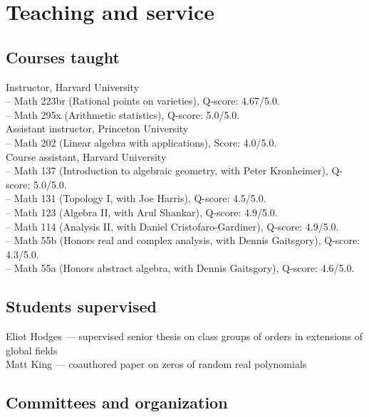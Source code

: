 \documentclass[11pt]{article} %
\begin{document}
\vspace*{-5PT}

\section*{Teaching and service}

\subsection*{Courses taught}

 Instructor, Harvard University \\
-- Math 223br (Rational points on varieties), Q-score: 4.67/5.0. \\
-- Math 295x (Arithmetic statistics), Q-score: 5.0/5.0. \\
 Assistant instructor, Princeton University \\
-- Math 202 (Linear algebra with applications), Score: 4.0/5.0. \\
 Course assistant, Harvard University \\
-- Math 137 (Introduction to algebraic geometry, with Peter Kronheimer), Q-score: 5.0/5.0. \\
-- Math 131 (Topology I, with Joe Harris), Q-score: 4.5/5.0. \\
-- Math 123 (Algebra II, with Arul Shankar), Q-score: 4.9/5.0. \\
-- Math 114 (Analysis II, with Daniel Cristofaro-Gardiner), Q-score: 4.9/5.0. \\
-- Math 55b (Honors real and complex analysis, with Dennis Gaitsgory), Q-score: 4.3/5.0. \\
-- Math 55a (Honors abstract algebra, with Dennis Gaitsgory), Q-score: 4.6/5.0.


\subsection*{Students supervised}

 Eliot Hodges --- supervised senior thesis on class groups of orders in extensions of global fields \\
 Matt King --- coauthored paper on zeros of random real polynomials

\subsection*{Committees and organization}
\end{document}
